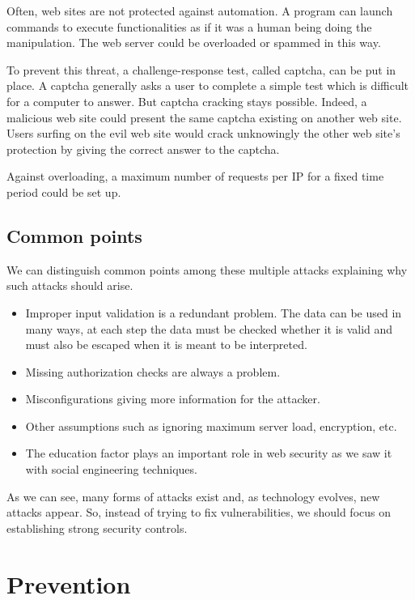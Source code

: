 Often, web sites are not protected against automation. A program can launch
commands to execute functionalities as if it was a human being doing the
manipulation. The web server could be overloaded or spammed in this way.

To prevent this threat, a challenge-response test, called captcha, can be put
in place. A captcha generally asks a user to complete a simple test which is
difficult for a computer to answer. But captcha cracking stays possible.
Indeed, a malicious web site could present the same captcha existing on
another web site. Users surfing on the evil web site would crack unknowingly
the other web site's protection by giving the correct answer to the captcha.

Against overloading, a maximum number of requests per IP for a fixed time
period could be set up.

\subsection{Common points}

We can distinguish common points among these multiple attacks explaining why
such attacks should arise.

\begin{itemize}
\item Improper input validation is a redundant problem. The data can be used
	in many ways, at each step the data must be checked whether it is valid
	and must also be escaped when it is meant to be interpreted.
\item Missing authorization checks are always a problem.
\item Misconfigurations giving more information for the attacker.
\item Other assumptions such as ignoring maximum server load, encryption, etc.
\item The education factor plays an important role in web security as we saw
	it with social engineering techniques.
\end{itemize}

As we can see, many forms of attacks exist and, as technology evolves, new
attacks appear. So, instead of trying to fix vulnerabilities, we should focus
on establishing strong security controls.


\section{Prevention}

